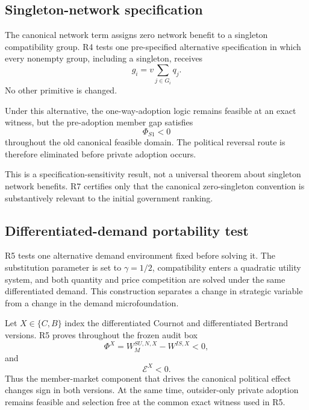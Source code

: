 \subsection{Singleton-network specification}
\label{subsec:singleton-network-sensitivity}

The canonical network term assigns zero network benefit to a singleton compatibility group. R4 tests one pre-specified alternative specification in which every nonempty group, including a singleton, receives
\[
g_i=v\sum_{j\in G_i}q_j.
\]
No other primitive is changed.

Under this alternative, the one-way-adoption logic remains feasible at an exact witness, but the pre-adoption member gap satisfies
\begin{equation}
    \Phi_{S1}<0
\end{equation}
throughout the old canonical feasible domain. The political reversal route is therefore eliminated before private adoption occurs.

This is a specification-sensitivity result, not a universal theorem about singleton network benefits. R7 certifies only that the canonical zero-singleton convention is substantively relevant to the initial government ranking.

\subsection{Differentiated-demand portability test}
\label{subsec:differentiated-portability}

R5 tests one alternative demand environment fixed before solving it. The substitution parameter is set to $\gamma=1/2$, compatibility enters a quadratic utility system, and both quantity and price competition are solved under the same differentiated demand. This construction separates a change in strategic variable from a change in the demand microfoundation.

Let $X\in\{C,B\}$ index the differentiated Cournot and differentiated Bertrand versions. R5 proves throughout the frozen audit box
\begin{equation}
    \Phi^X
    =
    W_M^{SU,N,X}-W^{IS,X}<0,
    \label{eq:r5-negative-phi}
\end{equation}
and
\begin{equation}
    \mathscr E^X<0.
    \label{eq:r5-negative-e}
\end{equation}
Thus the member-market component that drives the canonical political effect changes sign in both versions. At the same time, outsider-only private adoption remains feasible and selection free at the common exact witness used in R5.

